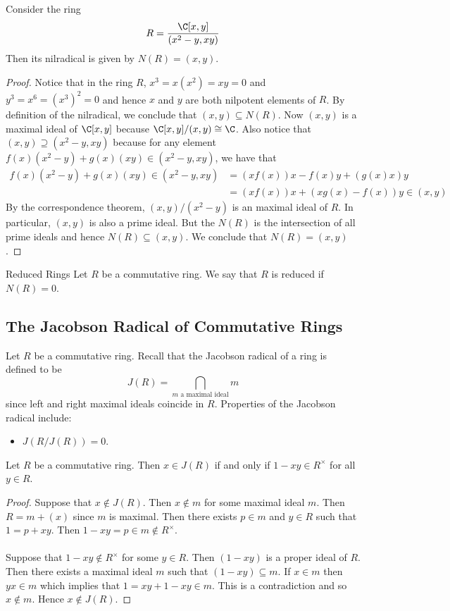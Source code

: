 \documentclass[a4paper]{article}
\begin{document}
\begin{eg}{}{} Consider the ring $$R=\frac{\C[x,y]}{(x^2-y,xy)}$$ Then its nilradical is given by $N(R)=(x,y)$. \tcbline
\begin{proof}
Notice that in the ring $R$, $x^3=x(x^2)=xy=0$ and $y^3=x^6=(x^3)^2=0$ and hence $x$ and $y$ are both nilpotent elements of $R$. By definition of the nilradical, we conclude that $(x,y)\subseteq N(R)$. Now $(x,y)$ is a maximal ideal of $\C[x,y]$ because $\C[x,y]/(x,y)\cong\C$. Also notice that $(x,y)\supseteq(x^2-y,xy)$ because for any element $f(x)(x^2-y)+g(x)(xy)\in(x^2-y,xy)$, we have that 
\begin{align*}
f(x)(x^2-y)+g(x)(xy)\in(x^2-y,xy)&=(xf(x))x-f(x)y+(g(x)x)y\\
&=(xf(x))x+(xg(x)-f(x))y\in (x,y)
\end{align*}
By the correspondence theorem, $(x,y)/(x^2-y)$ is an maximal ideal of $R$. In particular, $(x,y)$ is also a prime ideal. But the $N(R)$ is the intersection of all prime ideals and hence $N(R)\subseteq(x,y)$. We conclude that $N(R)=(x,y)$. 
\end{proof}
\end{eg}

\begin{defn}{Reduced Rings}{} Let $R$ be a commutative ring. We say that $R$ is reduced if $N(R)=0$. 
\end{defn}

\subsection{The Jacobson Radical of Commutative Rings}
Let $R$ be a commutative ring. Recall that the Jacobson radical of a ring is defined to be $$J(R)=\bigcap_{m\text{ a maximal ideal}}m$$ since left and right maximal ideals coincide in $R$. Properties of the Jacobson radical include: 
\begin{itemize}
\item $J(R/J(R))=0$. 
\end{itemize}

\begin{lmm}{}{} Let $R$ be a commutative ring. Then $x\in J(R)$ if and only if $1-xy\in R^\times$ for all $y\in R$. \tcbline
\begin{proof}
Suppose that $x\notin J(R)$. Then $x\notin m$ for some maximal ideal $m$. Then $R=m+(x)$ since $m$ is maximal. Then there exists $p\in m$ and $y\in R$ such that $1=p+xy$. Then $1-xy=p\in m\notin R^\times$. \\~\\

Suppose that $1-xy\notin R^\times$ for some $y\in R$. Then $(1-xy)$ is a proper ideal of $R$. Then there exists a maximal ideal $m$ such that $(1-xy)\subseteq m$. If $x\in m$ then $yx\in m$ which implies that $1=xy+1-xy\in m$. This is a contradiction and so $x\notin m$. Hence $x\notin J(R)$. 
\end{proof}
\end{lmm}
\end{document}
